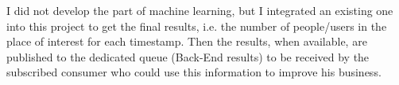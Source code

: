 I did not develop the part of machine learning, but I integrated an existing one into this project to get the final results, i.e. the number of people/users in the place of interest for each timestamp. Then the results, when available, are published to the dedicated queue (Back-End results) to be received by the subscribed consumer who could use this information to improve his business.
